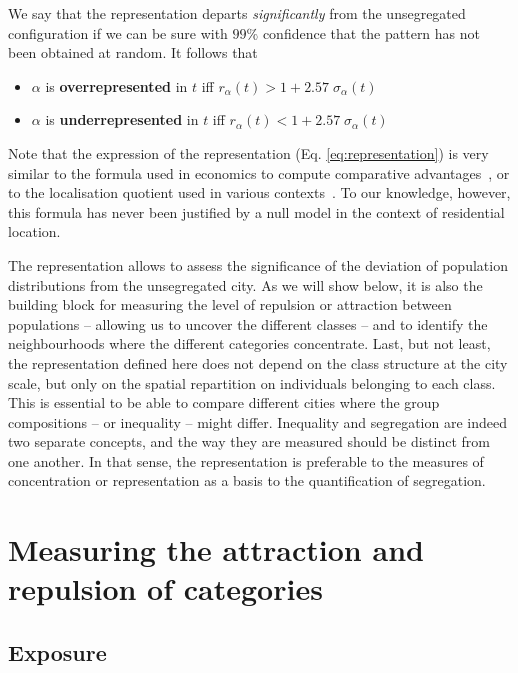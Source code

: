 We say that the representation departs \emph{significantly} from the
unsegregated configuration if we can be sure with $99\%$ confidence that the
pattern has not been obtained at random. It follows that

\begin{itemize}
    \item $\alpha$ is {\bf overrepresented} in $t$ iff $r_\alpha(t) > 1 +
  2.57\;\sigma_\alpha(t)$
    \item $\alpha$ is {\bf underrepresented} in $t$ iff $r_\alpha(t) < 1 +
  2.57\;\sigma_\alpha(t)$
\end{itemize}

Note that the expression of the representation (Eq. \ref{eq:representation}) is very
similar to the formula used in economics to compute comparative
advantages~\cite{Balassa:1965}, or to the localisation quotient used in various
contexts~\cite{Apparicio:2000, Schwabe:2011}. To our knowledge, however, this
formula has never been justified by a null model in the context of residential
location. 

The representation allows to assess the significance of the deviation
of population distributions from the unsegregated city. As we will show below,
it is also the building block for measuring the level of repulsion or attraction
between populations -- allowing us to uncover the different classes -- and to
identify the neighbourhoods where the different categories concentrate. 
Last,
but not least, the representation defined here does not depend on the class
structure at the city scale, but only on the spatial repartition on individuals
belonging to each class. This is essential to be able to compare different
cities where the group compositions -- or inequality -- might differ. Inequality
and segregation are indeed two separate concepts, and the way they are measured should
be distinct from one another. In that sense, the representation is preferable to
the measures of concentration or representation as a basis to the quantification
of segregation.


\section{Measuring the attraction and repulsion of categories}
\label{sec:measuring_the_attraction_and_repulsion_of_categories}

\subsection{Exposure}
\label{sub:exposure}


